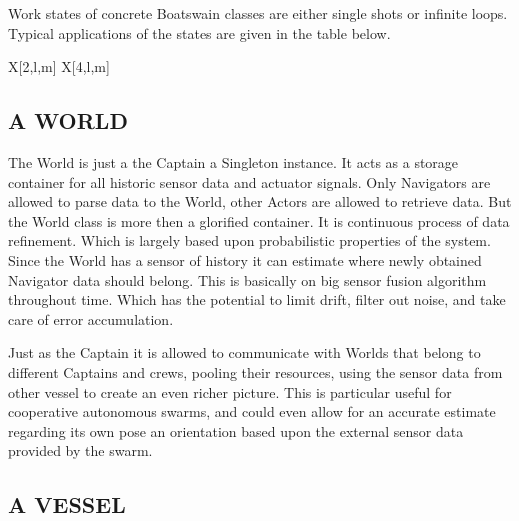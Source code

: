 \noindent Work states of concrete Boatswain classes are either single shots or infinite loops. Typical applications of
the states are given in the table below.

\begin{RoyalTable}{X[2,l,m] X[4,l,m]}
\end{RoyalTable}

\subsection{A WORLD}\label{seq:a world}

The World is just a the Captain a Singleton instance. It acts as a storage container for all historic sensor data and
actuator signals. Only Navigators are allowed to parse data to the World, other Actors are allowed to retrieve data. But
the World class is more then a glorified container. It is continuous process of data refinement. Which is largely based
upon probabilistic properties of the system. Since the World has a sensor of history it can estimate where newly
obtained Navigator data should belong. This is basically on big sensor fusion algorithm throughout time. Which has the
potential to limit drift, filter out noise, and take care of error accumulation.

Just as the Captain it is allowed to communicate with Worlds that belong to different Captains and crews, pooling their
resources, using the sensor data from other vessel to create an even richer picture. This is particular useful for
cooperative autonomous swarms, and could even allow for an accurate estimate regarding its own pose an orientation based
upon the external sensor data provided by the swarm.

\subsection{A VESSEL}\label{seq:a vessel}

